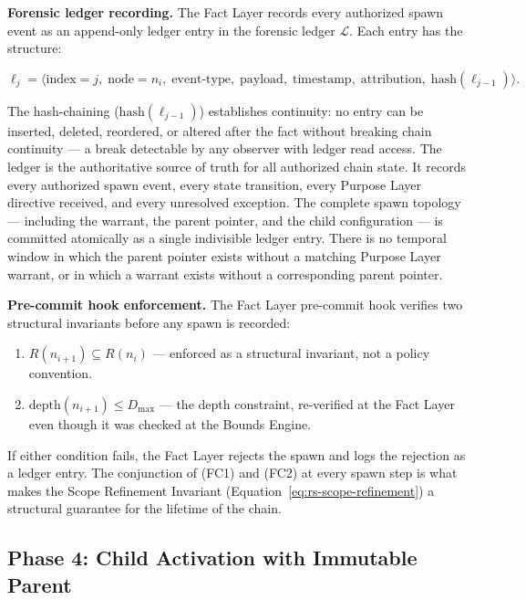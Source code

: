 \medskip
\noindent\textbf{Forensic ledger recording.} The Fact Layer records every authorized spawn event as an append-only ledger entry in the forensic ledger $\mathcal{L}$. Each entry has the structure:

\begin{equation}
\ell_j = \bigl\langle
\text{index}=j,\;
\text{node}=n_i,\;
\text{event-type},\;
\text{payload},\;
\text{timestamp},\;
\text{attribution},\;
\text{hash}(\ell_{j-1})
\bigr\rangle .
\label{eq:rs-ledger-entry}
\end{equation}

The hash-chaining ($\text{hash}(\ell_{j-1})$) establishes continuity: no entry can be inserted, deleted, reordered, or altered after the fact without breaking chain continuity — a break detectable by any observer with ledger read access. The ledger is the authoritative source of truth for all authorized chain state. It records every authorized spawn event, every state transition, every Purpose Layer directive received, and every unresolved exception. The complete spawn topology — including the warrant, the parent pointer, and the child configuration — is committed atomically as a single indivisible ledger entry. There is no temporal window in which the parent pointer exists without a matching Purpose Layer warrant, or in which a warrant exists without a corresponding parent pointer.

\medskip
\noindent\textbf{Pre-commit hook enforcement.} The Fact Layer pre-commit hook verifies two structural invariants before any spawn is recorded:

\begin{enumerate}
    \item[(FC1)] $R(n_{i+1}) \subseteq R(n_i)$ — enforced as a structural invariant, not a policy convention.
    \item[(FC2)] $\text{depth}(n_{i+1}) \leq D_{\max}$ — the depth constraint, re-verified at the Fact Layer even though it was checked at the Bounds Engine.
\end{enumerate}

If either condition fails, the Fact Layer rejects the spawn and logs the rejection as a ledger entry. The conjunction of (FC1) and (FC2) at every spawn step is what makes the Scope Refinement Invariant (Equation~\ref{eq:rs-scope-refinement}) a structural guarantee for the lifetime of the chain.

\subsection{Phase 4: Child Activation with Immutable Parent}

